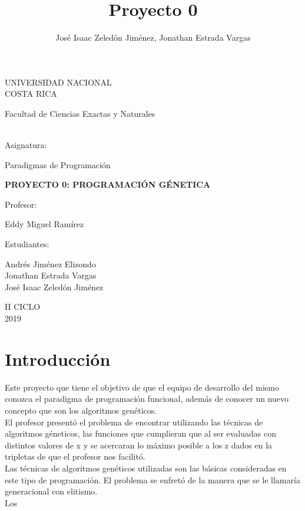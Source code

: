 \documentclass[10pt,a4paper]{article}
\author{José Isaac Zeledón Jiménez, Jonathan Estrada Vargas}
\title{Proyecto 0}
\begin{document}
\begin{titlepage}
\begin{center}
\begin{large}
UNIVERSIDAD NACIONAL\\
COSTA RICA \\
\end{large}
\vspace*{1cm}
\begin{large}
Facultad de Ciencias Exactas y Naturales
\end{large} 
\vspace*{1.8cm}\\
Asignatura:\\
\vspace*{2mm}
\begin{large}
Paradigmas de Programación\\
\end{large}
\vspace*{12mm}
\begin{large}
\textbf{PROYECTO 0: 
PROGRAMACIÓN GÉNETICA
}\\
\end{large}
\vspace*{1.8cm}
Profesor:\\
\vspace*{5mm}
\begin{large}
Eddy Miguel Ramírez\\
\end{large}
\vspace*{1.8cm}
Estudiantes: \\
\vspace*{5mm}
\begin{large}
Andrés Jiménez Elizondo\\
Jonathan Estrada Vargas\\
José Isaac Zeledón Jiménez\\
\end{large}
\vspace*{1.8cm}
II CICLO\\
\vspace*{1.8cm}
2019
\end{center}
\end{titlepage}
\tableofcontents
\pagebreak
\section{Introducción}
	Este proyecto que tiene el objetivo de que el equipo de desarrollo del mismo conozca el paradigma de programación funcional, además de conocer un nuevo concepto que son los algoritmos genéticos.\\
	El profesor presentó el problema de encontrar utilizando las técnicas de algoritmos géneticos, las funciones que cumplieran que al ser evaluadas con distintos valores de x y se acercaran lo máximo posible a los z dados en la tripletas de que el profesor nos facilitó.\\
	Las técnicas de algoritmos genéticos utilizadas son las básicas consideradas en este tipo de programación. El problema se enfretó de la manera que se le llamaría generacional con elitismo.\\
	Los 
\end{document}
